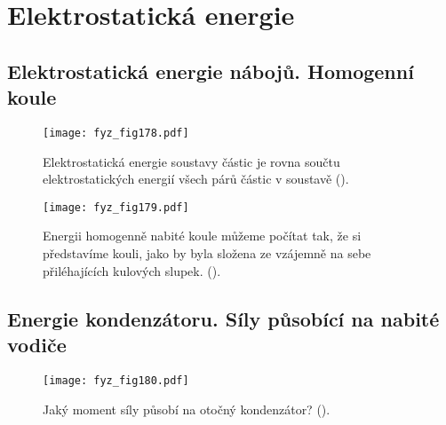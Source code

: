 \setchaptertoc
\chapter{Elektrostatická energie}\label{fyz:IIchapVI}



\section{Elektrostatická energie nábojů. Homogenní koule}\label{fyz:IIchapVIsecI}

  \begin{figure}[ht!]  %
    \centering
    \texttt{[image: fyz\_fig178.pdf]}
    \caption{Elektrostatická energie soustavy částic je rovna součtu elektrostatických energií 
             všech párů částic v soustavě
             (\cite[s.~140]{Feynman02}).}
    \label{fyz:fig178}
  \end{figure}
  
  \begin{figure}[ht!]  %
    \centering
    \texttt{[image: fyz\_fig179.pdf]}
    \caption{Energii homogenně nabité koule můžeme počítat tak, že si představíme kouli, jako by 
             byla složena ze vzájemně na sebe přiléhajících kulových slupek. 
             (\cite[s.~141]{Feynman02}).}
    \label{fyz:fig179}
  \end{figure}

\section{Energie kondenzátoru. Síly působící na nabité vodiče}\label{fyz:IIchapVIsecII}

  \begin{figure}[ht!]  %
    \centering
    \texttt{[image: fyz\_fig180.pdf]}
    \caption{Jaký moment síly působí na otočný kondenzátor?
             (\cite[s.~144]{Feynman02}).}
    \label{fyz:fig180}
  \end{figure}
  
